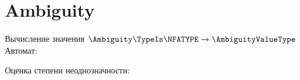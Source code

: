 \section{Ambiguity}
\begin{frame}{Вычисление значения $\Ambiguity\TypeIs\NFATYPE\to\AmbiguityValueType$}
	Автомат:


	Оценка степени неоднозначности:

\end{frame}
